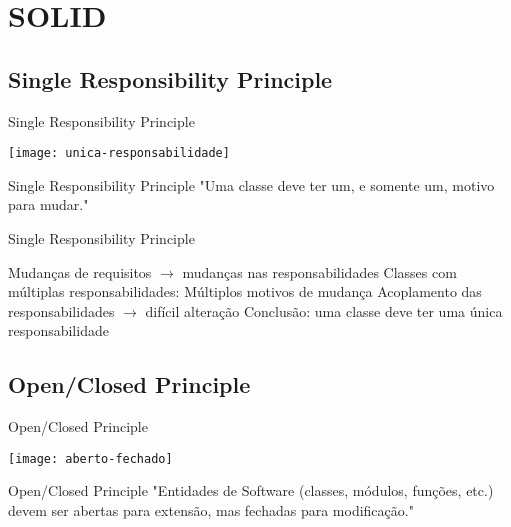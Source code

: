 \documentclass{beamer}
\begin{document}
\section{SOLID}

\subsection{Single Responsibility Principle}

\begin{frame}{Single Responsibility Principle}
  \begin{center}
    \texttt{[image: unica-responsabilidade]}
  \end{center}
\end{frame}

\begin{frame}{Single Responsibility Principle}
 "Uma classe deve ter um, e somente um, motivo para mudar."
\end{frame}

\begin{frame}{Single Responsibility Principle}
 \begin{outline}
   Mudanças de requisitos $\rightarrow$ mudanças nas responsabilidades
   Classes com múltiplas responsabilidades:
     Múltiplos motivos de mudança
     Acoplamento das responsabilidades $\rightarrow$ difícil alteração
   Conclusão: uma classe deve ter uma \alert{única} responsabilidade
 \end{outline}
\end{frame}

\subsection{Open/Closed Principle}

\begin{frame}{Open/Closed Principle}
  \begin{center}
    \texttt{[image: aberto-fechado]}
  \end{center}
\end{frame}

\begin{frame}{Open/Closed Principle}
 "Entidades de Software (classes, módulos, funções, etc.) devem ser abertas para extensão, mas fechadas para modificação."
\end{frame}
\end{document}

